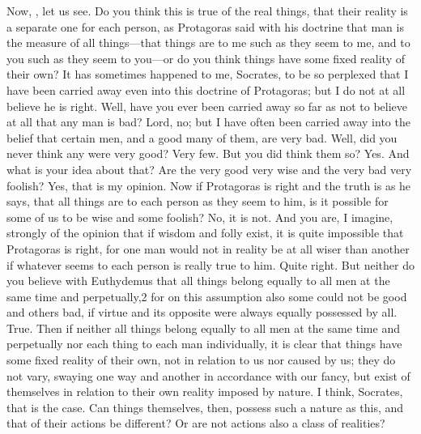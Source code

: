 \socratesspeaks
Now, \hermogenesspeaks, let us see. Do you think this is true of the real things, that their reality is a separate one for each person, as Protagoras said with his doctrine  that man is the measure of all things—that things are to me such as they seem to me, and to you such as they seem to you—or do you think things have some fixed reality of their own?
\hermogenesspeaks
It has sometimes happened to me, Socrates, to be so perplexed that I have been carried away even into this doctrine of Protagoras; but I do not at all believe he is right.
\socratesspeaks
Well, have you ever been carried away so far  as not to believe at all that any man is bad?
\hermogenesspeaks
Lord, no; but I have often been carried away into the belief that certain men, and a good many of them, are very bad.
\socratesspeaks
Well, did you never think any were very good?
\hermogenesspeaks
Very few.
\socratesspeaks
But you did think them so?
\hermogenesspeaks
Yes.
\socratesspeaks
And what is your idea about that? Are the very good very wise and the very bad very foolish? 
\hermogenesspeaks
Yes, that is my opinion.
\socratesspeaks
Now if Protagoras is right and the truth is as he says, that all things are to each person as they seem to him, is it possible for some of us to be wise and some foolish?
\hermogenesspeaks
No, it is not.
\socratesspeaks
And you are, I imagine, strongly of the opinion that if wisdom and folly exist, it is quite impossible that Protagoras is right, for one man would not in reality be at all wiser than another  if whatever seems to each person is really true to him.
\hermogenesspeaks
Quite right.
\socratesspeaks
But neither do you believe with Euthydemus that all things belong equally to all men at the same time and perpetually,2 for on this assumption also some could not be good and others bad, if virtue and its opposite were always equally possessed by all.
\hermogenesspeaks
True.
\socratesspeaks
Then if neither all things belong equally to all men at the same time and perpetually nor each thing to each man individually, it is clear that things have some fixed reality of their own,  not in relation to us nor caused by us; they do not vary, swaying one way and another in accordance with our fancy, but exist of themselves in relation to their own reality imposed by nature.
\hermogenesspeaks
I think, Socrates, that is the case.
\socratesspeaks
Can things themselves, then, possess such a nature as this, and that of their actions be different? Or are not actions also a class of realities?
